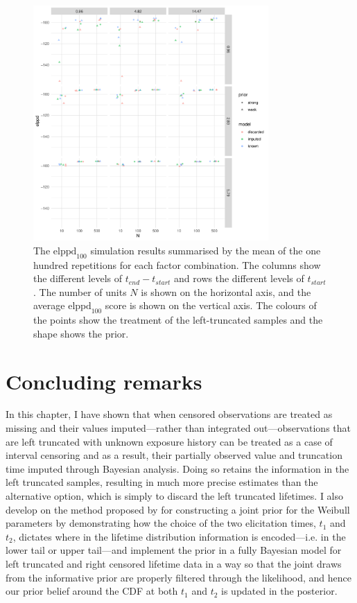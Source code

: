 \begin{figure}
    \centering
    \includegraphics[width=0.8\textwidth]{./figures/ch-2/sim-results-elppd.pdf}
    \caption{The $\text{elppd}_{100}$ simulation results summarised by the mean of the one hundred repetitions for each factor combination. The columns show the different levels of $t_{end} - t_{start}$ and rows the different levels of $t_{start}$. The number of units $N$ is shown on the horizontal axis, and the average $\text{elppd}_{100}$ score is shown on the vertical axis. The colours of the points show the treatment of the left-truncated samples and the shape shows the prior.}
    \label{fig:sim-study-elppd}
\end{figure}

\section{Concluding remarks} \label{sec:weibull-conclusion}

In this chapter, I have shown that when censored observations are treated as missing and their values imputed---rather than integrated out---observations that are left truncated with unknown exposure history can be treated as a case of interval censoring and as a result, their partially observed value and truncation time imputed through Bayesian analysis. Doing so retains the information in the left truncated samples, resulting in much more precise estimates than the alternative option, which is simply to discard the left truncated lifetimes. I also develop on the method proposed by \citet{kaminskiy2005} for constructing a joint prior for the Weibull parameters by demonstrating how the choice of the two elicitation times, $t_1$ and $t_2$, dictates where in the lifetime distribution information is encoded---i.e. in the lower tail or upper tail---and implement the prior in a fully Bayesian model for left truncated and right censored lifetime data in a way so that the joint draws from the informative prior are properly filtered through the likelihood, and hence our prior belief around the CDF at both $t_1$ and $t_2$ is updated in the posterior.

